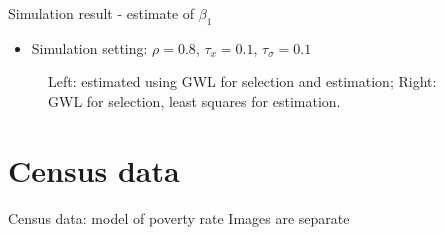 \documentclass{beamer}
\begin{document}
\begin{frame}{Simulation result - estimate of $\beta_1$} 

\begin{itemize}
	\item Simulation setting: $\rho=0.8$, $\tau_x=0.1$, $\tau_\sigma=0.1$
\end{itemize}
\vspace{-10mm}
\begin{figure}
\begin{center}
	\caption{Left: estimated using GWL for selection and estimation; Right: GWL for selection, least squares for estimation.}
\end{center}
\end{figure}
\end{frame} 


\section{Census data}


\begin{frame}{Census data: model of poverty rate} 
Images are separate
\end{frame} 
\end{document}
